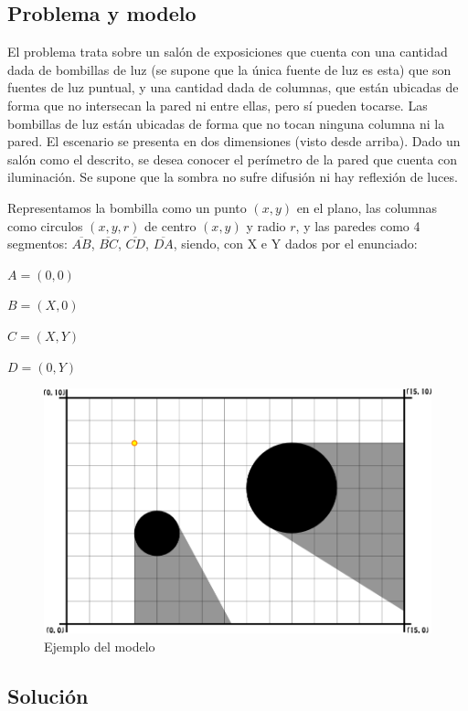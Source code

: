 \subsection*{Problema y modelo}
El problema trata sobre un salón de exposiciones que cuenta con una cantidad dada de
bombillas de luz (se supone que la única fuente de luz es esta) que son fuentes de
luz puntual, y una cantidad dada de columnas, que están ubicadas de forma que no
intersecan la pared ni entre ellas, pero sí pueden tocarse. Las bombillas de luz están
ubicadas de forma que no tocan ninguna columna ni la pared. El escenario se presenta
en dos dimensiones (visto desde arriba). Dado un salón como
el descrito, se desea conocer el perímetro de la pared que cuenta con iluminación.
Se supone que la sombra no sufre difusión ni hay reflexión de luces.

Representamos la bombilla como un punto $(x,y)$ en el plano, las columnas como circulos
$(x,y,r)$ de centro $(x,y)$ y radio $r$, y las paredes como 4 segmentos: $\overline{AB}$,
$\overline{BC}$, $\overline{CD}$, $\overline{DA}$, siendo, con X e Y dados por el enunciado:

\vspace{0.2cm}
$A = (0, 0)$

$B = (X, 0)$

$C = (X, Y)$

$D = (0, Y)$
\vspace{0.2cm}

\begin{figure}[H]
\centering
\label{bl_1}
\caption{\sc Ejemplo del modelo}
\includegraphics[scale=1.0]{./figuras/bl_1.png}
\end{figure} 

\subsection*{Solución}

